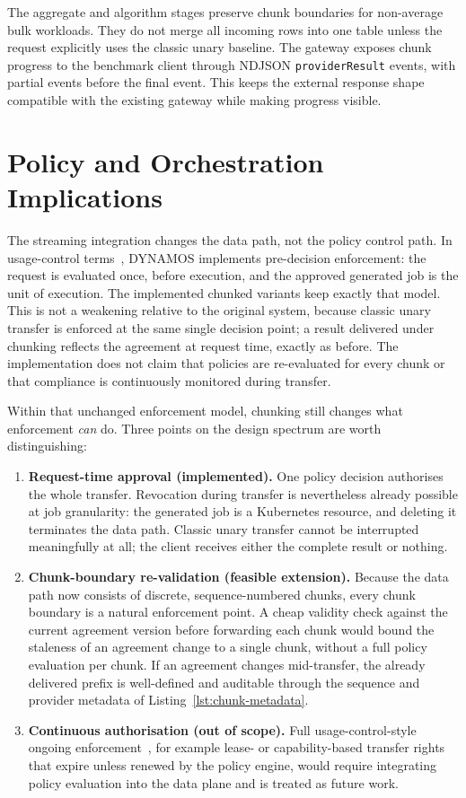 The aggregate and algorithm stages preserve chunk boundaries for non-average bulk workloads. They do not merge all incoming rows into one table unless the request explicitly uses the classic unary baseline. The gateway exposes chunk progress to the benchmark client through NDJSON \texttt{providerResult} events, with partial events before the final event. This keeps the external response shape compatible with the existing gateway while making progress visible.

\section{Policy and Orchestration Implications}\label{sec:policy-implications}

The streaming integration changes the data path, not the policy control path. In usage-control terms~\cite{park2004ucon}, DYNAMOS implements pre-decision enforcement: the request is evaluated once, before execution, and the approved generated job is the unit of execution. The implemented chunked variants keep exactly that model. This is not a weakening relative to the original system, because classic unary transfer is enforced at the same single decision point; a result delivered under chunking reflects the agreement at request time, exactly as before. The implementation does not claim that policies are re-evaluated for every chunk or that compliance is continuously monitored during transfer.

Within that unchanged enforcement model, chunking still changes what enforcement \emph{can} do. Three points on the design spectrum are worth distinguishing:

\begin{enumerate}
  \item \textbf{Request-time approval (implemented).} One policy decision authorises the whole transfer. Revocation during transfer is nevertheless already possible at job granularity: the generated job is a Kubernetes resource, and deleting it terminates the data path. Classic unary transfer cannot be interrupted meaningfully at all; the client receives either the complete result or nothing.
  \item \textbf{Chunk-boundary re-validation (feasible extension).} Because the data path now consists of discrete, sequence-numbered chunks, every chunk boundary is a natural enforcement point. A cheap validity check against the current agreement version before forwarding each chunk would bound the staleness of an agreement change to a single chunk, without a full policy evaluation per chunk. If an agreement changes mid-transfer, the already delivered prefix is well-defined and auditable through the sequence and provider metadata of Listing~\ref{lst:chunk-metadata}.
  \item \textbf{Continuous authorisation (out of scope).} Full usage-control-style ongoing enforcement~\cite{park2004ucon,hariri2023uconplus}, for example lease- or capability-based transfer rights that expire unless renewed by the policy engine, would require integrating policy evaluation into the data plane and is treated as future work.
\end{enumerate}

